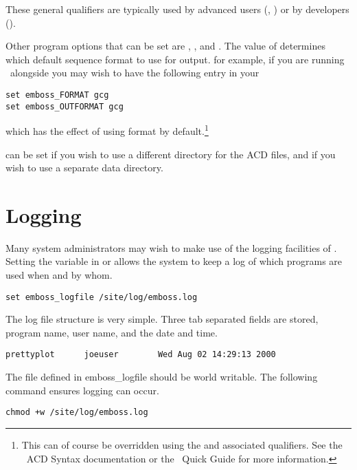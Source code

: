 \documentclass{report}
\begin{document}
These general qualifiers are typically used by advanced users
(, ) or by developers
().


Other program options that can be set are ,
, and . The value of
 determines which default sequence format to
use for output. for example, if you are running \EMBOSS\ alongside
 you may wish to have the following entry in your

\begin{verbatim}
set emboss_FORMAT gcg
set emboss_OUTFORMAT gcg
\end{verbatim}

which has the effect of using  format by
default.\footnote{This can of course be overridden using the
 and  associated qualifiers. See
the \EMBOSS\ ACD Syntax documentation or the \EMBOSS\ Quick Guide for
more information.}

  can be set if you
wish to use a different directory for the ACD files, and
  if you wish to use a
separate data directory.


\section{Logging}

Many system administrators may wish to make use of the logging
facilities of \EMBOSS. Setting the variable 
in  or  allows the system
to keep a log of which programs are used when and by whom.

\begin{verbatim}
set emboss_logfile /site/log/emboss.log
\end{verbatim}

The log file structure is very simple. Three tab separated fields are
stored, program name, user name, and the date and time.

\begin{verbatim}
prettyplot      joeuser        Wed Aug 02 14:29:13 2000
\end{verbatim}

The file defined in emboss\_logfile should be world writable. The
following command ensures logging can occur.

\begin{verbatim}
chmod +w /site/log/emboss.log
\end{verbatim}
\end{document}
